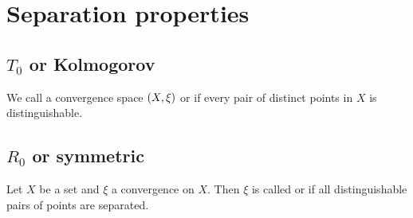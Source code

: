 \section{Separation properties}
\subsection{$T_0$ or Kolmogorov}
\begin{definition}
We call a convergence space $\sSet{X, \xi}$  or  if every pair of distinct points in $X$ is distinguishable.
\end{definition}

\subsection{$R_0$ or symmetric}
\begin{definition}
Let $X$ be a set and $\xi$ a convergence on $X$. Then $\xi$ is called  or  if all distinguishable pairs of points are separated.
\end{definition}

